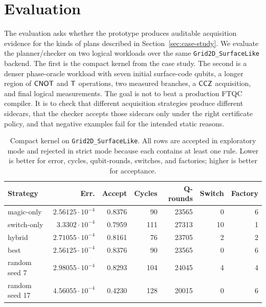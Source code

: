 \section{Evaluation}

The evaluation asks whether the prototype produces auditable acquisition evidence for the kinds of plans described in Section~\ref{sec:case-study}.
We evaluate the planner/checker on two logical workloads over the same \texttt{Grid2D\_SurfaceLike} backend.
The first is the compact  kernel from the case study.
The second is a denser phase-oracle workload with seven initial surface-code qubits, a longer region of $\mathsf{CNOT}$ and $\mathsf{T}$ operations, two measured branches, a $\mathsf{CCZ}$ acquisition, and final logical measurements.
The goal is not to beat a production FTQC compiler.
It is to check that different acquisition strategies produce different sidecars, that the checker accepts those sidecars only under the right certificate policy, and that negative examples fail for the intended static reasons.

\begin{table}[t]
\centering
\caption{Compact  kernel on \texttt{Grid2D\_SurfaceLike}. All rows are accepted in exploratory mode and rejected in strict mode because each contains at least one \Assumed{} rule. Lower is better for error, cycles, qubit-rounds, switches, and factories; higher is better for acceptance.}
\label{tab:surface-kernel-results}
\begin{tabular}{lrrrrrr}
\toprule
Strategy & Err. & Accept & Cycles & Q-rounds & Switch & Factory \\
\midrule
magic-only & $2.56125{\cdot}10^{-4}$ & 0.8376 & 90 & 23565 & 0 & 6 \\
switch-only & $3.3302{\cdot}10^{-4}$ & 0.7959 & 111 & 27313 & 10 & 1 \\
hybrid & $2.71055{\cdot}10^{-4}$ & 0.8161 & 76 & 23705 & 2 & 2 \\
best & $2.56125{\cdot}10^{-4}$ & 0.8376 & 90 & 23565 & 0 & 6 \\
random seed 7 & $2.98055{\cdot}10^{-4}$ & 0.8293 & 104 & 24045 & 4 & 4 \\
random seed 17 & $4.56055{\cdot}10^{-4}$ & 0.4230 & 128 & 20015 & 0 & 6 \\
\bottomrule
\end{tabular}
\end{table}


